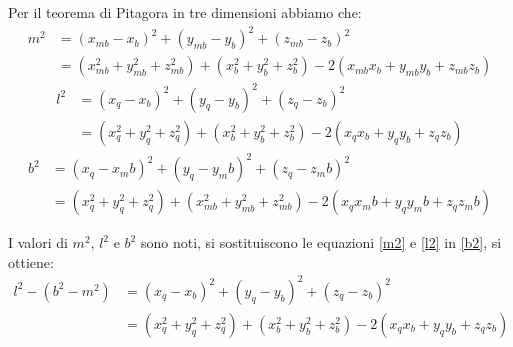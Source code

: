 \documentclass[11pt]{article}
\begin{document}
Per il teorema di Pitagora in tre dimensioni abbiamo che:
\begin{align}\label{m2}
    m^2 &= (x_{mb}-x_b)^2+(y_{mb}-y_b)^2+(z_{mb}-z_b)^2\\
    		&= (x_{mb}^2+y_{mb}^2+z_{mb}^2)+(x_{b}^2+y_{b}^2+z_{b}^2)-2(x_{mb}x_b+y_{mb}y_b+z_{mb}z_b)
\end{align}
\begin{align}\label{l2}
    l^2 &= (x_{q}-x_b)^2+(y_{q}-y_b)^2+(z_{q}-z_b)^2\\
    		&= (x_{q}^2+y_{q}^2+z_{q}^2)+(x_{b}^2+y_{b}^2+z_{b}^2)-2(x_{q}x_b+y_{q}y_b+z_{q}z_b)
\end{align}
\begin{align}\label{b2}
    b^2 &= (x_{q}-x_mb)^2+(y_{q}-y_mb)^2+(z_{q}-z_mb)^2\\
    		&= (x_{q}^2+y_{q}^2+z_{q}^2)+(x_{mb}^2+y_{mb}^2+z_{mb}^2)-2(x_{q}x_mb+y_{q}y_mb+z_{q}z_mb)
\end{align}

I valori di $m^2$, $l^2$ e $b^2$ sono noti, si sostituiscono le equazioni \eqref{m2} e \eqref{l2} in \eqref{b2}, si ottiene:
\begin{align}\label{passaggio}
    l^2-(b^2-m^2) &= (x_{q}-x_b)^2+(y_{q}-y_b)^2+(z_{q}-z_b)^2\\
    		&= (x_{q}^2+y_{q}^2+z_{q}^2)+(x_{b}^2+y_{b}^2+z_{b}^2)-2(x_{q}x_b+y_{q}y_b+z_{q}z_b)
\end{align}
\end{document}
